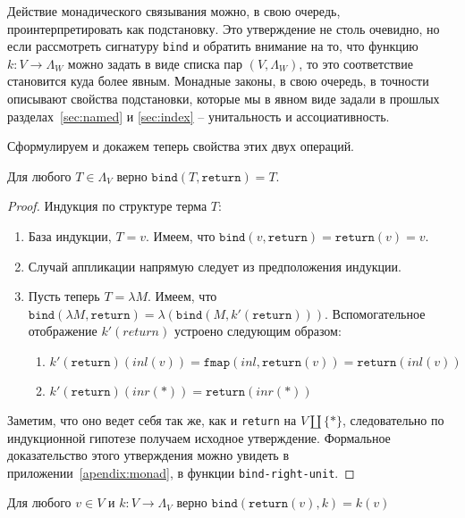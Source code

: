 Действие монадического связывания можно, в свою очередь, проинтерпретировать как подстановку. Это утверждение не столь очевидно, но если рассмотреть сигнатуру \texttt{bind} и обратить внимание на то, что функцию $k : V \to \Lambda_{W}$ можно задать в виде списка пар $(V, \Lambda_{W})$, то это соответствие становится куда более явным. Монадные законы, в свою очередь, в точности описывают свойства подстановки, которые мы в явном виде задали в прошлых разделах~\ref{sec:named} и \ref{sec:index} -- унитальность и ассоциативность.

Сформулируем и докажем теперь свойства этих двух операций.

\begin{prop}
  \label{monad:bind-right-unit}
  Для любого $T \in \Lambda_{V}$ верно $\texttt{bind}(T, \texttt{return}) = T$.
\end{prop}

\begin{proof}
  Индукция по структуре терма $T$:
  \begin{enumerate}
    \item База индукции, $T = v$. Имеем, что $\texttt{bind}(v, \texttt{return}) = \texttt{return}(v) = v$.
    \item Случай аппликации напрямую следует из предположения индукции.
    \item Пусть теперь $T = \lambda M$. Имеем, что $\texttt{bind}(\lambda M, \texttt{return}) = \lambda (\texttt{bind}(M, k'(\texttt{return})))$. Вспомогательное отображение $k'(return)$ устроено следующим образом:
    \begin{enumerate}
      \item $k'(\texttt{return})(inl(v)) = \texttt{fmap}(inl, \texttt{return}(v)) = \texttt{return}(inl(v))$
      \item $k'(\texttt{return})(inr(*)) = \texttt{return}(inr(*))$
    \end{enumerate}
  \end{enumerate}

  Заметим, что оно ведет себя так же, как и \texttt{return} на $V \coprod \{*\}$, следовательно по индукционной гипотезе получаем исходное утверждение.
  Формальное доказательство этого утверждения можно увидеть в приложении~\ref{apendix:monad}, в функции \texttt{bind-right-unit}.
\end{proof}

\begin{prop}
  \label{monad:bind-left-unit}
  Для любого $v \in V$ и $k : V \to \Lambda_{V}$ верно $\texttt{bind}(\texttt{return}(v), k) = k(v)$
\end{prop}

